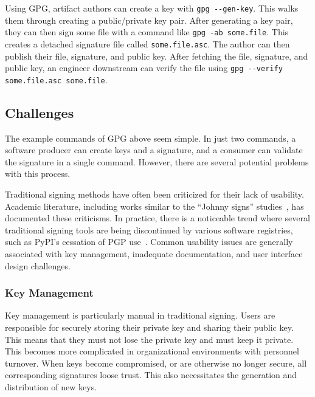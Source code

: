 \documentclass{IEEEcsmagTechrxiv}
\begin{document}
Using GPG, artifact authors can create a key with \verb|gpg --gen-key|.
This walks them through creating a public/private key pair.
After generating a key pair, they can then sign some file with a command like \verb|gpg -ab some.file|.
This creates a detached signature file called \verb|some.file.asc|.
The author can then publish their file, signature, and public key.
After fetching the file, signature, and public key, an engineer downstream  can verify the file using \verb|gpg --verify some.file.asc some.file|.


\subsection{Challenges}

The example commands of GPG above seem simple.
In just two commands, a software producer can create keys and a signature, and a consumer can validate the signature in a single command.
However, there are several potential problems with this process.

Traditional signing methods have often been criticized for their lack of usability.
Academic literature, including works similar to the ``Johnny signs'' studies~\cite{JohnnySigns1}, has documented these criticisms.
In practice, there is a noticeable trend where several traditional signing tools are being discontinued by various software registries, such as PyPI's cessation of PGP use~\cite{schorlemmer_signing}.
Common usability issues are generally associated with key management, inadequate documentation, and user interface design challenges.

\subsubsection{Key Management}
Key management is particularly manual in traditional signing.
Users are responsible for securely storing their private key and sharing their public key.
This means that they must not lose the private key and must keep it private.
This becomes more complicated in organizational environments with personnel turnover.
When keys become compromised, or are otherwise no longer secure, all corresponding signatures loose trust.
This also necessitates the generation and distribution of new keys.
\end{document}
